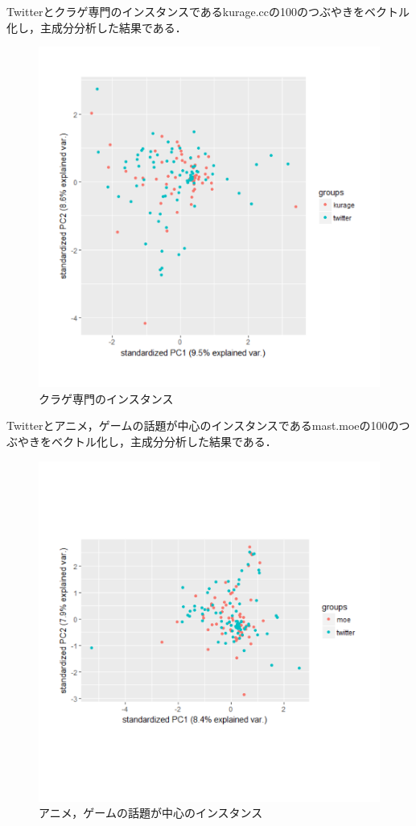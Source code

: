 Twitterとクラゲ専門のインスタンスであるkurage.ccの100のつぶやきをベクトル化し，主成分分析した結果である．
\begin{figure}[h]
\centering
\includegraphics[width=13cm,clip]{kurage.pdf}
\caption{クラゲ専門のインスタンス}\label{kurage}
\end{figure}
\newpage

Twitterとアニメ，ゲームの話題が中心のインスタンスであるmast.moeの100のつぶやきをベクトル化し，主成分分析した結果である．
\begin{figure}[h]
\centering
\includegraphics[width=13cm,clip]{moe.pdf}
\caption{アニメ，ゲームの話題が中心のインスタンス}\label{moe}
\end{figure}
\newpage

